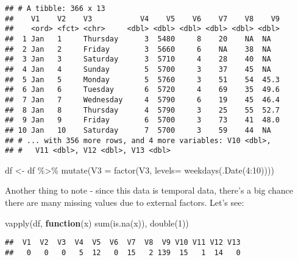 \documentclass[
]{book}
\newenvironment{Shaded}{\begin{snugshade}}{\end{snugshade}}
\newcommand{\AttributeTok}[1]{\textcolor[rgb]{0.77,0.63,0.00}{#1}}
\newcommand{\ControlFlowTok}[1]{\textcolor[rgb]{0.13,0.29,0.53}{\textbf{#1}}}
\newcommand{\DecValTok}[1]{\textcolor[rgb]{0.00,0.00,0.81}{#1}}
\newcommand{\FunctionTok}[1]{\textcolor[rgb]{0.00,0.00,0.00}{#1}}
\newcommand{\NormalTok}[1]{#1}
\newcommand{\OtherTok}[1]{\textcolor[rgb]{0.56,0.35,0.01}{#1}}
\newcommand{\SpecialCharTok}[1]{\textcolor[rgb]{0.00,0.00,0.00}{#1}}
\begin{document}
\begin{verbatim}
## # A tibble: 366 x 13
##    V1    V2    V3           V4    V5    V6    V7    V8    V9
##    <ord> <fct> <chr>     <dbl> <dbl> <dbl> <dbl> <dbl> <dbl>
##  1 Jan   1     Thursday      3  5480     8    20    NA  NA  
##  2 Jan   2     Friday        3  5660     6    NA    38  NA  
##  3 Jan   3     Saturday      3  5710     4    28    40  NA  
##  4 Jan   4     Sunday        5  5700     3    37    45  NA  
##  5 Jan   5     Monday        5  5760     3    51    54  45.3
##  6 Jan   6     Tuesday       6  5720     4    69    35  49.6
##  7 Jan   7     Wednesday     4  5790     6    19    45  46.4
##  8 Jan   8     Thursday      4  5790     3    25    55  52.7
##  9 Jan   9     Friday        6  5700     3    73    41  48.0
## 10 Jan   10    Saturday      7  5700     3    59    44  NA  
## # ... with 356 more rows, and 4 more variables: V10 <dbl>,
## #   V11 <dbl>, V12 <dbl>, V13 <dbl>
\end{verbatim}

\begin{Shaded}
\begin{Highlighting}[]
\NormalTok{df }\OtherTok{\textless{}{-}}\NormalTok{ df }\SpecialCharTok{\%\textgreater{}\%} 
  \FunctionTok{mutate}\NormalTok{(}\AttributeTok{V3 =} \FunctionTok{factor}\NormalTok{(V3, }\AttributeTok{levels=} 
                       \FunctionTok{weekdays}\NormalTok{(}\FunctionTok{.Date}\NormalTok{(}\DecValTok{4}\SpecialCharTok{:}\DecValTok{10}\NormalTok{))))}
\end{Highlighting}
\end{Shaded}

Another thing to note - since this data is temporal data, there's a big chance there are many missing values due to external factors. Let's see:

\begin{Shaded}
\begin{Highlighting}[]
\FunctionTok{vapply}\NormalTok{(df, }\ControlFlowTok{function}\NormalTok{(x) }\FunctionTok{sum}\NormalTok{(}\FunctionTok{is.na}\NormalTok{(x)), }\FunctionTok{double}\NormalTok{(}\DecValTok{1}\NormalTok{))}
\end{Highlighting}
\end{Shaded}

\begin{verbatim}
##  V1  V2  V3  V4  V5  V6  V7  V8  V9 V10 V11 V12 V13 
##   0   0   0   5  12   0  15   2 139  15   1  14   0
\end{verbatim}
\end{document}
